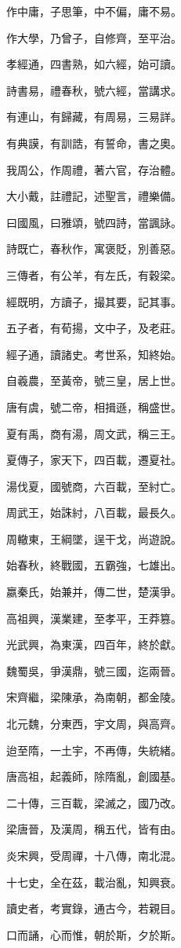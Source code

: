 \documentclass[20pt,a4paper]{article}
\begin{document}
\begin{huge}
作中庸，子思筆，中不偏，庸不易。

作大學，乃曾子，自修齊，至平治。

孝經通，四書熟，如六經，始可讀。

詩書易，禮春秋，號六經，當講求。

有連山，有歸藏，有周易，三易詳。

有典謨，有訓誥，有誓命，書之奧。

我周公，作周禮，著六官，存治體。

大小戴，註禮記，述聖言，禮樂備。

曰國風，曰雅頌，號四詩，當諷詠。

詩既亡，春秋作，寓褒貶，別善惡。

三傳者，有公羊，有左氏，有穀梁。

經既明，方讀子，撮其要，記其事。

五子者，有荀揚，文中子，及老莊。
\clearpage

\end{huge}
\begin{LARGE}
經子通，讀諸史。考世系，知終始。

自羲農，至黃帝，號三皇，居上世。

唐有虞，號二帝，相揖遜，稱盛世。

夏有禹，商有湯，周文武，稱三王。

夏傳子，家天下，四百載，遷夏社。

湯伐夏，國號商，六百載，至紂亡。

周武王，始誅紂，八百載，最長久。

周轍東，王綱墜，逞干戈，尚遊說。

始春秋，終戰國，五霸強，七雄出。

嬴秦氏，始兼并，傳二世，楚漢爭。

高祖興，漢業建，至孝平，王莽篡。

光武興，為東漢，四百年，終於獻。

魏蜀吳，爭漢鼎，號三國，迄兩晉。

宋齊繼，梁陳承，為南朝，都金陵。

北元魏，分東西，宇文周，與高齊。

迨至隋，一土宇，不再傳，失統緒。

唐高祖，起義師，除隋亂，創國基。

二十傳，三百載，梁滅之，國乃改。

梁唐晉，及漢周，稱五代，皆有由。

炎宋興，受周禪，十八傳，南北混。

十七史，全在茲，載治亂，知興衰。

讀史者，考實錄，通古今，若親目。

口而誦，心而惟，朝於斯，夕於斯。
\newpage
\end{LARGE}
\end{document}
